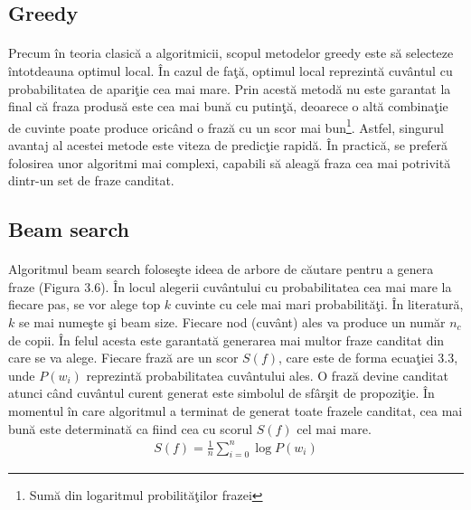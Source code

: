 \subsection{Greedy}

\paragraph{}
Precum \^ in teoria clasic\u a a algoritmicii, scopul metodelor greedy este s\u a selecteze \^ intotdeauna optimul local. \^ In cazul de fa\c t\u a, optimul local reprezint\u a cuv\^ antul cu probabilitatea de apari\c tie cea mai mare. Prin acest\u a metod\u a nu este garantat la final c\u a fraza produs\u a este cea mai bun\u a cu putin\c t\u a, deoarece o alt\u a combina\c tie de cuvinte poate produce oric\^ and o fraz\u a cu un scor mai bun\footnote{Sum\u a din logaritmul probilit\u a\c tilor frazei}. Astfel, singurul avantaj al acestei metode este viteza de predic\c tie rapid\u a. \^ In practic\u a, se prefer\u a folosirea unor algoritmi mai complexi, capabili s\u a aleag\u a fraza cea mai potrivit\u a dintr-un set de fraze canditat.

\subsection{Beam search}

\paragraph{}
Algoritmul beam search folose\c ste ideea de arbore de c\u autare pentru a genera fraze (Figura 3.6). \^ In locul alegerii cuv\^ antului cu probabilitatea cea mai mare la fiecare pas, se vor alege top \(k\) cuvinte cu cele mai mari probabilit\u a\c ti. \^ In literatur\u a, \(k\) se mai nume\c ste \c si beam size. Fiecare nod (cuv\^ ant) ales va produce un num\u ar \(n_c\) de copii. \^ In felul acesta este garantat\u a generarea mai multor fraze canditat din care se va alege. Fiecare fraz\u a are un scor \(S(f)\), care este de forma ecua\c tiei 3.3, unde \(P(w_{i})\) reprezint\u a probabilitatea cuv\^ antului ales. O fraz\u a devine canditat atunci c\^ and cuv\^ antul curent generat este simbolul de sf\^ ar\c sit de propozi\c tie. \^ In momentul \^ in care algoritmul a terminat de generat toate frazele canditat, cea mai bun\u a este determinat\u a ca fiind cea cu scorul \(S(f)\) cel mai mare.\\

\begin{equation}
\begin{split}
S(f) = \frac{1}{n} \sum_{i=0}^{n} \log P(w_{i})
\end{split}
\end{equation}

